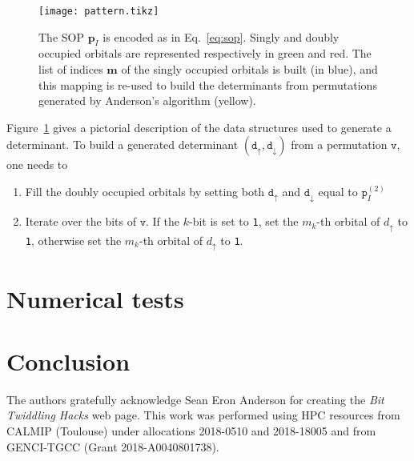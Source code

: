 \documentclass[aip,jcp,reprint,showkeys]{revtex4-1}
\newcommand{\tv}{\mathtt{v}}
\newcommand{\md}{\mathtt{d}}
\newcommand{\mpp}{\mathtt{p}}
\newcommand{\mpv}{\mathbf{p}}
\newcommand{\up}{\uparrow}
\newcommand{\dn}{\downarrow}
\newcommand{\one}{{\texttt{1}}}
\begin{document}
\begin{figure}[t]
\texttt{[image: pattern.tikz]} 
\caption{The SOP $\mpv_I$ is encoded as in Eq.~\eqref{eq:sop}. Singly and doubly
occupied orbitals are represented respectively in green and red.
The list of indices $\mathbf{m}$ of the singly occupied orbitals is built (in blue), and this
mapping is re-used to build the determinants from permutations generated by Anderson's algorithm (yellow).}
\label{fig:mapping}
\end{figure}

Figure~\ref{fig:mapping} gives a pictorial description of the data structures used to generate a determinant.
To build a generated determinant $(\md_\up,\md_\dn)$ from a permutation $\tv$, one needs to
\begin{enumerate}
    \item Fill the doubly occupied orbitals by setting both $\md_\up$ and $\md_\dn$
          equal to $\mpp_I^{(2)}$
    \item Iterate over the bits of $\tv$. If the $k$-bit is set to \one{}, set the $m_k$-th orbital of $d_\up$ to \one, otherwise set the $m_k$-th orbital of $d_\up$ to \one.
\end{enumerate}




\section{Numerical tests}


\section{Conclusion}


\begin{acknowledgments}
The authors gratefully acknowledge Sean Eron Anderson for creating the 
\emph{Bit Twiddling Hacks} web page.
This work was performed using HPC resources from CALMIP (Toulouse) under
allocations 2018-0510 and 2018-18005 and from GENCI-TGCC (Grant
2018-A0040801738).
\end{acknowledgments}



\end{document}
